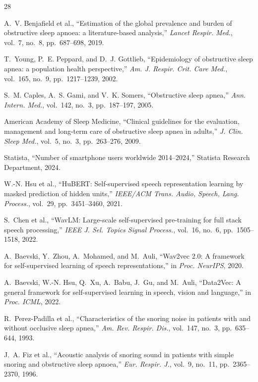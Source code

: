 \documentclass[conference]{IEEEtran}
\begin{document}
\begin{thebibliography}{28}

A.~V. Benjafield et al., ``Estimation of the global prevalence and burden of
obstructive sleep apnoea: a literature-based analysis,'' \emph{Lancet Respir.
Med.}, vol.~7, no.~8, pp.~687--698, 2019.

T.~Young, P.~E. Peppard, and D.~J. Gottlieb, ``Epidemiology of obstructive
sleep apnea: a population health perspective,'' \emph{Am. J. Respir. Crit.
Care Med.}, vol.~165, no.~9, pp.~1217--1239, 2002.

S.~M. Caples, A.~S. Gami, and V.~K. Somers, ``Obstructive sleep apnea,''
\emph{Ann. Intern. Med.}, vol.~142, no.~3, pp.~187--197, 2005.

American Academy of Sleep Medicine, ``Clinical guidelines for the evaluation,
management and long-term care of obstructive sleep apnea in adults,''
\emph{J. Clin. Sleep Med.}, vol.~5, no.~3, pp.~263--276, 2009.

Statista, ``Number of smartphone users worldwide 2014--2024,'' Statista
Research Department, 2024.

W.-N. Hsu et al., ``HuBERT: Self-supervised speech representation learning
by masked prediction of hidden units,'' \emph{IEEE/ACM Trans. Audio, Speech,
Lang. Process.}, vol.~29, pp.~3451--3460, 2021.

S.~Chen et al., ``WavLM: Large-scale self-supervised pre-training for full
stack speech processing,'' \emph{IEEE J. Sel. Topics Signal Process.},
vol.~16, no.~6, pp.~1505--1518, 2022.

A.~Baevski, Y.~Zhou, A.~Mohamed, and M.~Auli, ``Wav2vec 2.0: A framework
for self-supervised learning of speech representations,'' in \emph{Proc.
NeurIPS}, 2020.

A.~Baevski, W.-N. Hsu, Q.~Xu, A.~Babu, J.~Gu, and M.~Auli, ``Data2Vec:
A general framework for self-supervised learning in speech, vision and
language,'' in \emph{Proc. ICML}, 2022.

R.~Perez-Padilla et al., ``Characteristics of the snoring noise in patients
with and without occlusive sleep apnea,'' \emph{Am. Rev. Respir. Dis.},
vol.~147, no.~3, pp.~635--644, 1993.

J.~A. Fiz et al., ``Acoustic analysis of snoring sound in patients with
simple snoring and obstructive sleep apnoea,'' \emph{Eur. Respir. J.},
vol.~9, no.~11, pp.~2365--2370, 1996.


\end{thebibliography}
\end{document}
